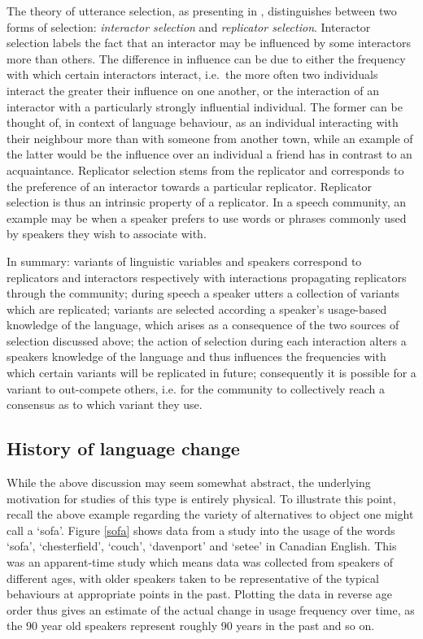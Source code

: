 \documentclass[12pt]{article}
\begin{document}
The theory of utterance selection, as presenting in \cite{croft}, distinguishes between two forms of selection: \emph{interactor selection} and \emph{replicator selection}. Interactor selection labels the fact that an interactor may be influenced by some interactors more than others. The difference in influence can be due to either the frequency with which certain interactors interact, i.e.\ the more often two individuals interact the greater their influence on one another, or the interaction of an interactor with a particularly strongly influential individual. The former can be thought of, in context of language behaviour, as an individual interacting with their neighbour more than with someone from another town, while an example of the latter would be the influence over an individual a friend has in contrast to an acquaintance. Replicator selection stems from the replicator and corresponds to the preference of an interactor towards a particular replicator. Replicator selection is thus an intrinsic property of a replicator. In a speech community, an example may be when a speaker prefers to use words or phrases commonly used by speakers they wish to associate with. 

In summary: variants of linguistic variables and speakers correspond to replicators and interactors respectively with interactions propagating replicators through the community; during speech a speaker utters a collection of variants which are replicated; variants are selected according a speaker's usage-based knowledge of the language, which arises as a consequence of the two sources of selection discussed above; the action of selection during each interaction alters a speakers knowledge of the language and thus influences the frequencies with which certain variants will be replicated in future; consequently it is possible for a variant to out-compete others, i.e. for the community to collectively reach a consensus as to which variant they use.

\subsection{History of language change}
While the above discussion may seem somewhat abstract, the underlying motivation for studies of this type is entirely physical. To illustrate this point, recall the above example regarding the variety of alternatives to object one might call a `sofa'. Figure \ref{sofa} shows data from a study into the usage of the words `sofa', `chesterfield', `couch', `davenport' and `setee' in Canadian English. This was an apparent-time study which means data was collected from speakers of different ages, with older speakers taken to be representative of the typical behaviours at appropriate points in the past. Plotting the data in reverse age order thus gives an estimate of the actual change in usage frequency over time, as the 90 year old speakers represent roughly 90 years in the past and so on.
\end{document}
